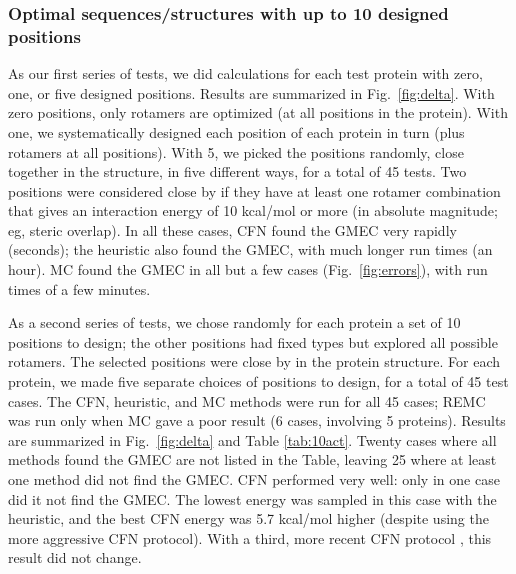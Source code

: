 \subsubsection{Optimal sequences/structures with up to 10 designed positions}
As our first series of tests, we did calculations for each test protein with zero, one, or five designed positions. Results are summarized in Fig.\ \ref{fig:delta}. With zero positions, only rotamers are optimized (at all positions in the protein). With one, we systematically designed each position of each protein in turn (plus rotamers at all positions). With 5, we picked the positions randomly, close together in the structure, in five different ways, for a total of 45 tests. Two positions were considered close by if they have at least one rotamer combination that gives an interaction energy of 10 kcal/mol or more (in absolute magnitude; eg, steric overlap). In all these cases, CFN found the GMEC very rapidly (seconds); the heuristic also found the GMEC, with much longer run times (an hour). MC found the GMEC in all but a few cases (Fig.\ \ref{fig:errors}), with run times of a few minutes. 

As a second series of tests, we chose randomly for each protein a set of 10 positions to design; the other positions had fixed types but explored all possible rotamers. The selected positions were close by in the protein structure. For each protein, we made five separate choices of positions to design, for a total of 45 test cases. The CFN, heuristic, and MC methods were run for all 45 cases; REMC was run only when MC gave a poor result (6 cases, involving 5 proteins).
Results are summarized in Fig.\ \ref{fig:delta} and Table \ref{tab:10act}. Twenty cases where all methods found the GMEC are not listed in the Table, leaving 25 where at least one method did not find the GMEC. CFN performed very well: only in one case did it not find the GMEC. The lowest energy was sampled in this case with the heuristic, and the best CFN energy was 5.7 kcal/mol higher (despite using the more aggressive CFN protocol). With a third, more recent CFN protocol \cite{Simoncini15}, this result did not change. 

